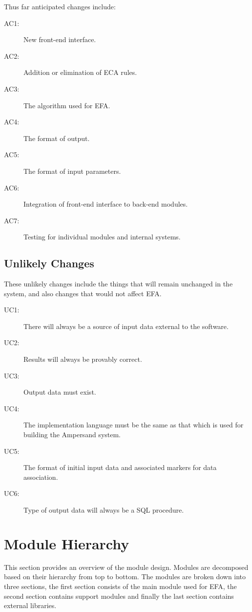 \documentclass[12pt]{article}
\begin{document}
Thus far anticipated changes include:

\begin{description}
    \item[AC1:] New front-end interface.
    \item[AC2:] Addition or elimination of ECA rules.
    \item[AC3:] The algorithm used for EFA.
    \item[AC4:] The format of output.
    \item[AC5:] The format of input parameters.
    \item[AC6:] Integration of front-end interface to back-end modules.
    \item[AC7:] Testing for individual modules and internal systems.
    
\end{description}

\subsection{Unlikely Changes} 

These unlikely changes include the things that will remain unchanged in the 
system, and also changes that would not affect EFA. 

\begin{description}
    \item[UC1:] There will always be a source of input data external to the 
    software.
    \item[UC2:] Results will always be provably correct.
    \item[UC3:] Output data must exist.
    \item[UC4:] The implementation language must be the same as that which is 
    used for building the Ampersand system.
    \item[UC5:] The format of initial input data and associated markers for 
    data association.
    \item[UC6:] Type of output data will always be a SQL procedure.
\end{description}

\section{Module Hierarchy}
This section provides an overview of the module design. Modules are decomposed 
based on their hierarchy from top to bottom. The modules are broken down into 
three sections, the first section consists of the main module used for EFA, 
the second section contains support modules and finally the last section
contains external libraries.
\end{document}
